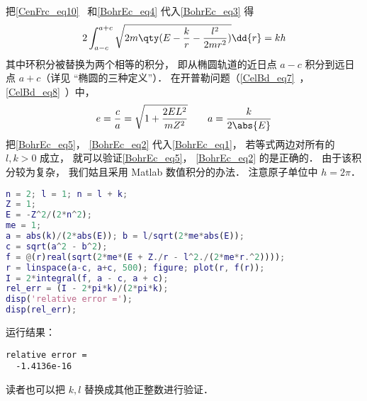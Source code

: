 把\autoref{CenFrc_eq10}~ 和\autoref{BohrEc_eq4}  代入\autoref{BohrEc_eq3} 得
\begin{equation}\label{BohrEc_eq1}
2\int_{a-c}^{a+c} \sqrt{2m\qty(E - \frac{k}{r} - \frac{l^2}{2mr^2})} \dd{r} = kh
\end{equation}
其中环积分被替换为两个相等的积分， 即从椭圆轨道的近日点 $a-c$ 积分到远日点 $a+c$（详见 “椭圆的三种定义”）． 在开普勒问题（\autoref{CelBd_eq7}~，\autoref{CelBd_eq8}~）中，
\begin{equation}
e = \frac{c}{a} = \sqrt{1 + \frac{2EL^2}{mZ^2}}
\qquad
a = \frac{k}{2\abs{E}}
\end{equation}
把\autoref{BohrEc_eq5}， \autoref{BohrEc_eq2} 代入\autoref{BohrEc_eq1}， 若等式两边对所有的 $l,k > 0$ 成立， 就可以验证\autoref{BohrEc_eq5}， \autoref{BohrEc_eq2} 的是正确的． 由于该积分较为复杂， 我们姑且采用 Matlab 数值积分的办法． 注意原子单位中 $h = 2\pi$．
\begin{lstlisting}[language=matlab]
n = 2; l = 1; n = l + k;
Z = 1;
E = -Z^2/(2*n^2);
me = 1;
a = abs(k)/(2*abs(E)); b = l/sqrt(2*me*abs(E));
c = sqrt(a^2 - b^2);
f = @(r)real(sqrt(2*me*(E + Z./r - l^2./(2*me*r.^2))));
r = linspace(a-c, a+c, 500); figure; plot(r, f(r));
I = 2*integral(f, a - c, a + c);
rel_err = (I - 2*pi*k)/(2*pi*k);
disp('relative error =');
disp(rel_err);
\end{lstlisting}
运行结果： 
\begin{lstlisting}[language=matlabC]
relative error =
  -1.4136e-16
\end{lstlisting}
读者也可以把 $k, l$ 替换成其他正整数进行验证．
